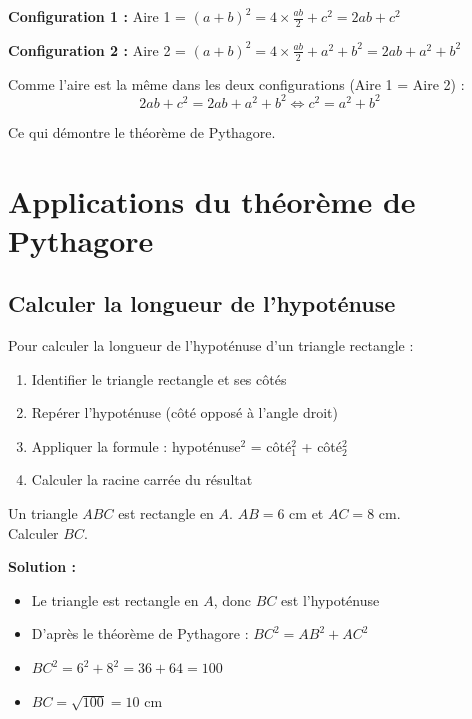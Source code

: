 \textbf{Configuration 1 :} Aire 1 = $(a+b)^2 = 4 \times \frac{ab}{2} + c^2 = 2ab + c^2$

\textbf{Configuration 2 :} Aire 2 = $(a+b)^2 = 4 \times \frac{ab}{2} + a^2 + b^2 = 2ab + a^2 + b^2$

Comme l'aire est la même dans les deux configurations (Aire 1 = Aire 2) :
\[2ab + c^2 = 2ab + a^2 + b^2 \Leftrightarrow c^2 = a^2 + b^2\]

Ce qui démontre le théorème de Pythagore.

\section{Applications du théorème de Pythagore}

\subsection{Calculer la longueur de l'hypoténuse}

\begin{methodebox}
Pour calculer la longueur de l'hypoténuse d'un triangle rectangle :
\begin{enumerate}
    \item Identifier le triangle rectangle et ses côtés
    \item Repérer l'hypoténuse (côté opposé à l'angle droit)
    \item Appliquer la formule : hypoténuse$^2$ = côté$_1^2$ + côté$_2^2$
    \item Calculer la racine carrée du résultat
\end{enumerate}
\end{methodebox}

\begin{examplebox}
Un triangle $ABC$ est rectangle en $A$. $AB = 6$ cm et $AC = 8$ cm.\\
Calculer $BC$.

\textbf{Solution :}
\begin{itemize}
    \item Le triangle est rectangle en $A$, donc $BC$ est l'hypoténuse
    \item D'après le théorème de Pythagore : $BC^2 = AB^2 + AC^2$
    \item $BC^2 = 6^2 + 8^2 = 36 + 64 = 100$
    \item $BC = \sqrt{100} = 10$ cm
\end{itemize}
\end{examplebox}


